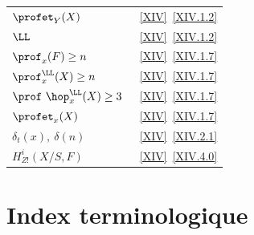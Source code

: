 \begin{tabular}{p{9cm}p{3cm}}
$\profet_{Y}(X)$\ \dotfill & \ref{XIV}~\ref{XIV.1.2}\\
$\LL$\ \dotfill & \ref{XIV}~\ref{XIV.1.2}\\
$\prof_{x}(F) \geq n$\ \dotfill & \ref{XIV}~\ref{XIV.1.7}\\
$\prof_{x}^{\LL}(X)\geq n$\ \dotfill & \ref{XIV}~\ref{XIV.1.7}\\
$\prof\ \hop^{\LL}_{x}(X) \geq 3$\ \dotfill & \ref{XIV}~\ref{XIV.1.7}\\
$\profet_{x}(X)$\ \dotfill& \ref{XIV}~\ref{XIV.1.7}\\
$\delta_{t}(x), \ \delta (n)$\ \dotfill & \ref{XIV}~\ref{XIV.2.1}\\
$H^{i}_{Z!}(X/S, F)$\ \dotfill & \ref{XIV}~\ref{XIV.4.0}
\end{tabular}

\chapter*{Index terminologique}

